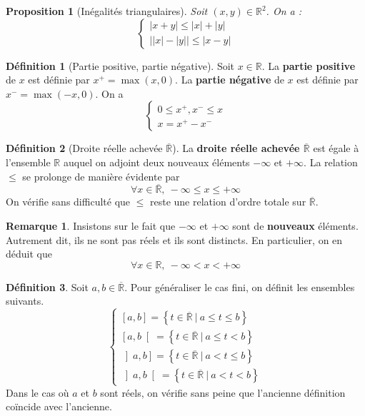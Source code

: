 \documentclass[french]{book}
\newcommand{\R}{\mathbb{R}}
\theoremstyle{plain}
\newtheorem{prop}{Proposition}[chapter]
\theoremstyle{definition}
\newtheorem{dfn}{Définition}[chapter]
\newtheorem{rmq}{Remarque}[chapter]
\theoremstyle{remark}
\begin{document}
\begin{prop}[Inégalités triangulaires]
	Soit $(x,y)\in\R^2$. On a : $$\left \{\begin{array}{ll} \lvert x+y\rvert \leqslant\lvert x\rvert+\lvert y\rvert \\ \big|\lvert x\rvert -\lvert y\rvert\big|\leqslant\lvert x-y\rvert\end{array}\right.$$
\end{prop}
\begin{dfn}[Partie positive, partie négative]
	Soit $x\in\R$. La \textbf{partie positive} de $x$ est définie par $x^+=\max(x,0)$. La \textbf{partie négative} de $x$ est définie par $x^-=\max(-x,0)$. On a $$\left \{\begin{array}{ll}0\leqslant x^+,x^-\leqslant x \\ x=x^+-x^-\end{array}\right.$$
\end{dfn}
\begin{dfn}[Droite réelle achevée $\overline{\R}$]
	La \textbf{droite réelle achevée $\overline{\R}$} est égale à l'ensemble $\R$ auquel on adjoint deux nouveaux éléments $-\infty$ et $+\infty$. La relation $\leqslant$ se prolonge de manière évidente par $$\forall x\in\overline{\R},\ -\infty\leqslant x\leqslant+\infty$$ On vérifie sans difficulté que $\leqslant$ reste une relation d'ordre totale sur $\overline{\R}$.
\end{dfn}
\begin{rmq}
	Insistons sur le fait que $-\infty$ et $+\infty$ sont de \textbf{nouveaux} éléments. Autrement dit, ils ne sont pas réels et ils sont distincts. En particulier, on en déduit que $$\forall x\in\R,\ -\infty<x<+\infty$$
\end{rmq}
\begin{dfn}
	Soit $a,b\in\overline{\R}$. Pour généraliser le cas fini, on définit les ensembles suivants. $$\left \{ \begin{array}{llll} \left[a,b\right]=\left\{t\in\overline{\R} \ | \ a\leqslant t\leqslant b\right\} \\ \left[a,b\right[=\left\{t\in\overline{\R} \ | \ a\leqslant t< b\right\} \\ \left]a,b\right]=\left\{t\in\overline{\R} \ | \ a<t\leqslant b\right\} \\ \left]a,b\right[=\left\{t\in\overline{\R} \ | \ a<t< b\right\}\end{array}\right.$$ Dans le cas où $a$ et $b$ sont réels, on vérifie sans peine que l'ancienne définition coïncide avec l'ancienne.
\end{dfn}
\end{document}
